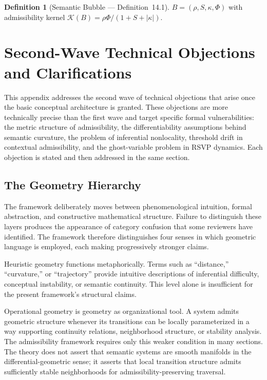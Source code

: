 \documentclass[12pt,oneside]{book}
\theoremstyle{plain}
\theoremstyle{definition}
\newtheorem{definition}[theorem]{Definition}
\theoremstyle{plain}
\begin{document}
\begin{definition}[Semantic Bubble --- Definition~14.1]
$B = (\rho, S, \kappa, \Phi)$ with admissibility kernel $\mathcal{K}(B) = \rho\Phi/(1+S+|\kappa|)$.
\end{definition}

\chapter{Second-Wave Technical Objections and Clarifications}
\label{app:second_wave}

This appendix addresses the second wave of technical objections that arise once the basic conceptual architecture is granted. These objections are more technically precise than the first wave and target specific formal vulnerabilities: the metric structure of admissibility, the differentiability assumptions behind semantic curvature, the problem of inferential nonlocality, threshold drift in contextual admissibility, and the ghost-variable problem in RSVP dynamics. Each objection is stated and then addressed in the same section.

\section{The Geometry Hierarchy}

The framework deliberately moves between phenomenological intuition, formal abstraction, and constructive mathematical structure. Failure to distinguish these layers produces the appearance of category confusion that some reviewers have identified. The framework therefore distinguishes four senses in which geometric language is employed, each making progressively stronger claims.

Heuristic geometry functions metaphorically. Terms such as ``distance,'' ``curvature,'' or ``trajectory'' provide intuitive descriptions of inferential difficulty, conceptual instability, or semantic continuity. This level alone is insufficient for the present framework's structural claims.

Operational geometry is geometry as organizational tool. A system admits geometric structure whenever its transitions can be locally parameterized in a way supporting continuity relations, neighborhood structure, or stability analysis. The admissibility framework requires only this weaker condition in many sections. The theory does not assert that semantic systems are smooth manifolds in the differential-geometric sense; it asserts that local transition structure admits sufficiently stable neighborhoods for admissibility-preserving traversal.
\end{document}
